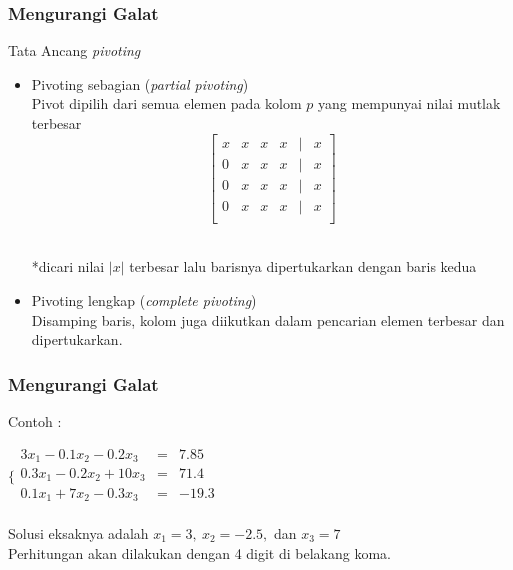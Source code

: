 \documentclass{beamer}
\begin{document}
\begin{frame}
\frametitle{Mengurangi Galat}
Tata Ancang \textit{pivoting}
\begin{itemize}
\item Pivoting sebagian (\textit{partial pivoting})
\\Pivot dipilih dari semua elemen pada kolom $p$ yang mempunyai nilai mutlak terbesar
\\
\begin{equation}
\begin{bmatrix}
	x & x & x & x & | & x\\
	0 & \boxed{x} & x & x & | & x\\
	0 & \boxed{x} & x & x & | & x\\
	0 & \boxed{x} & x & x & | & x\\
\end{bmatrix}
\nonumber
\end{equation}
\ \\\begin{small}*dicari nilai $|x|$ terbesar lalu barisnya dipertukarkan dengan baris kedua\end{small}
\item Pivoting lengkap (\textit{complete pivoting})
\\Disamping baris, kolom juga diikutkan dalam pencarian elemen terbesar dan dipertukarkan.
\end{itemize}
\end{frame}


\begin{frame}
\frametitle{Mengurangi Galat}
Contoh : 
\\\begin{center}
$\Biggl\{\begin{matrix}
	3x_1-0.1x_2-0.2x_3 & =&7.85\\
	0.3x_1-0.2x_2+10x_3 & =&71.4\\
	0.1x_1+7x_2-0.3x_3 & =&-19.3\\
\end{matrix}$
\end{center}
Solusi eksaknya adalah $x_1=3,\ x_2=-2.5,$ dan $x_3=7$
\\Perhitungan akan dilakukan dengan 4 digit di belakang koma.
\end{frame}

\end{document}
